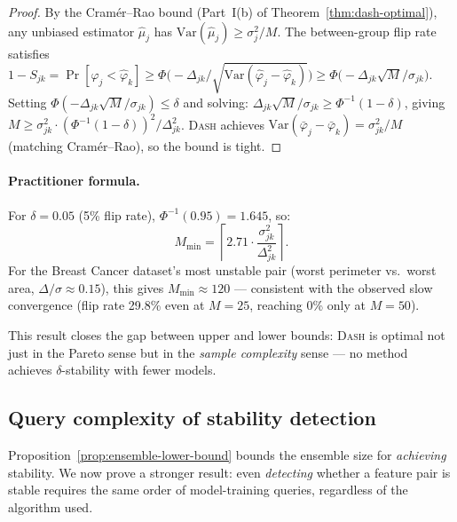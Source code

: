 \documentclass{article}
\newcommand{\Var}{\mathrm{Var}}
\newcommand{\DASH}{\textsc{Dash}}
\begin{document}
\begin{proof}
By the Cram\'er--Rao bound (Part~I(b) of
Theorem~\ref{thm:dash-optimal}), any unbiased estimator
$\hat\mu_j$ has $\Var(\hat\mu_j) \geq \sigma_j^2/M$. The
between-group flip rate satisfies
$1 - S_{jk} = \Pr[\hat\varphi_j < \hat\varphi_k]
\geq \Phi\bigl(-\Delta_{jk}/\sqrt{\Var(\hat\varphi_j - \hat\varphi_k)}\bigr)
\geq \Phi\bigl(-\Delta_{jk}\sqrt{M}/\sigma_{jk}\bigr)$.
Setting $\Phi(-\Delta_{jk}\sqrt{M}/\sigma_{jk}) \leq \delta$
and solving: $\Delta_{jk}\sqrt{M}/\sigma_{jk} \geq \Phi^{-1}(1-\delta)$,
giving $M \geq \sigma_{jk}^2 \cdot (\Phi^{-1}(1-\delta))^2 / \Delta_{jk}^2$.
\DASH{} achieves $\Var(\bar\varphi_j - \bar\varphi_k) = \sigma_{jk}^2/M$
(matching Cram\'er--Rao), so the bound is tight.
\end{proof}

\paragraph{Practitioner formula.}
For $\delta = 0.05$ (5\% flip rate), $\Phi^{-1}(0.95) = 1.645$, so:
\[
    M_{\min} = \left\lceil 2.71 \cdot
    \frac{\sigma_{jk}^2}{\Delta_{jk}^2} \right\rceil.
\]
For the Breast Cancer dataset's most unstable pair (worst perimeter vs.\
worst area, $\Delta/\sigma \approx 0.15$), this gives $M_{\min} \approx 120$
--- consistent with the observed slow convergence (flip rate 29.8\% even
at $M{=}25$, reaching 0\% only at $M{=}50$).

This result closes the gap between upper and lower bounds: \DASH{} is
optimal not just in the Pareto sense but in the \emph{sample complexity}
sense --- no method achieves $\delta$-stability with fewer models.

\subsection{Query complexity of stability detection}
\label{sec:query-complexity}

Proposition~\ref{prop:ensemble-lower-bound} bounds the ensemble size for
\emph{achieving} stability. We now prove a stronger result: even
\emph{detecting} whether a feature pair is stable requires the same order
of model-training queries, regardless of the algorithm used.
\end{document}
